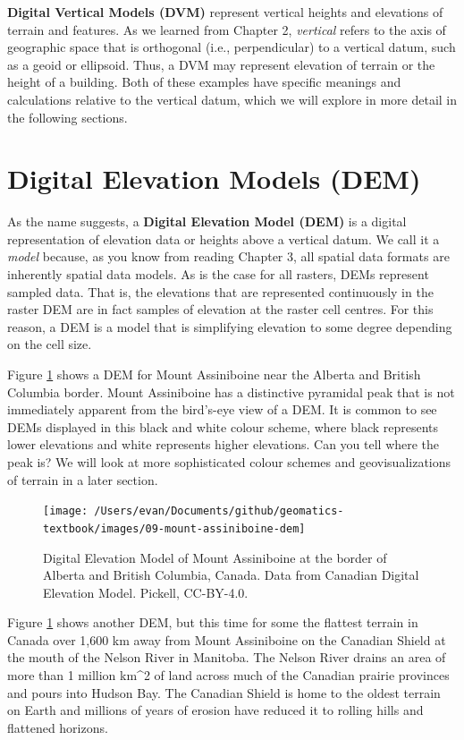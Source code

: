 \documentclass[
]{book}
\begin{document}
\textbf{Digital Vertical Models (DVM)} represent vertical heights and elevations of terrain and features. As we learned from Chapter 2, \emph{vertical} refers to the axis of geographic space that is orthogonal (i.e., perpendicular) to a vertical datum, such as a geoid or ellipsoid. Thus, a DVM may represent elevation of terrain or the height of a building. Both of these examples have specific meanings and calculations relative to the vertical datum, which we will explore in more detail in the following sections.

\hypertarget{digital-elevation-models-dem}{%
\section{Digital Elevation Models (DEM)}\label{digital-elevation-models-dem}}

As the name suggests, a \textbf{Digital Elevation Model (DEM)} is a digital representation of elevation data or heights above a vertical datum. We call it a \emph{model} because, as you know from reading Chapter 3, all spatial data formats are inherently spatial data models. As is the case for all rasters, DEMs represent sampled data. That is, the elevations that are represented continuously in the raster DEM are in fact samples of elevation at the raster cell centres. For this reason, a DEM is a model that is simplifying elevation to some degree depending on the cell size.

Figure \ref{fig:9-mount-assiniboine-dem} shows a DEM for Mount Assiniboine near the Alberta and British Columbia border. Mount Assiniboine has a distinctive pyramidal peak that is not immediately apparent from the bird's-eye view of a DEM. It is common to see DEMs displayed in this black and white colour scheme, where black represents lower elevations and white represents higher elevations. Can you tell where the peak is? We will look at more sophisticated colour schemes and geovisualizations of terrain in a later section.

\begin{figure}
\texttt{[image: /Users/evan/Documents/github/geomatics-textbook/images/09-mount-assiniboine-dem]} \caption{Digital Elevation Model of Mount Assiniboine at the border of Alberta and British Columbia, Canada. Data from Canadian Digital Elevation Model. Pickell, CC-BY-4.0.}\label{fig:9-mount-assiniboine-dem}
\end{figure}

Figure \ref{fig:9-mount-assiniboine-dem} shows another DEM, but this time for some the flattest terrain in Canada over 1,600 km away from Mount Assiniboine on the Canadian Shield at the mouth of the Nelson River in Manitoba. The Nelson River drains an area of more than 1 million km\^{}2 of land across much of the Canadian prairie provinces and pours into Hudson Bay. The Canadian Shield is home to the oldest terrain on Earth and millions of years of erosion have reduced it to rolling hills and flattened horizons.
\end{document}
